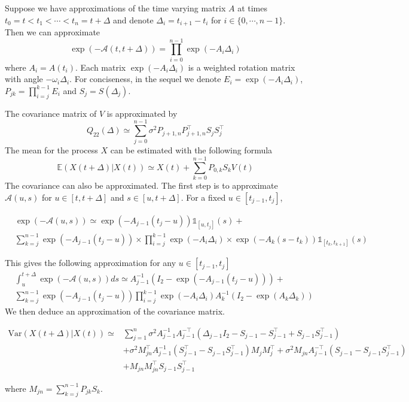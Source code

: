 \documentclass[aoas]{imsart}
\theoremstyle{definition}
\theoremstyle{remark}
\theoremstyle{remark}
\newcommand {\E}{\mathbb{E}}
\newcommand {\1}{\mathbb{1}}
\begin{document}
Suppose we have approximations of the time varying matrix $A$ at times $t_0=t < t_1 < \cdots < t_n=t+\Delta$ and denote $\Delta_i=t_{i+1}-t_i$ for $i \in \{0,\cdots,n-1\}$.
Then we can approximate
\[\exp(-\mathcal{A}(t,t+\Delta))=\prod_{i=0}^{n-1} \exp(-A_i\Delta_i)\]
where $A_i=A(t_i)$. Each matrix $\exp(-A_i\Delta_i)$ is a weighted rotation matrix with angle $-\omega_i\Delta_i$.
For conciseness, in the sequel we denote $E_i=\exp(-A_i\Delta_i)$, $P_{jk}= \prod_{i=j}^{k-1} E_i$ and $S_j=S(\Delta_j)$.

The covariance matrix of $V$ is approximated by 
\[Q_{22}(\Delta)\simeq\sum_{j=0}^{n-1} \sigma^2 P_{j+1,n} P_{j+1,n}^\top S_j S_j^\top\]
The mean for the process $X$ can be estimated with the following formula
\[\E(X(t+\Delta) \vert X(t)) \simeq X(t)+\sum_{k=0}^{n-1} P_{0,k} S_k  V(t) \]
The covariance can also be approximated. The first step is to approximate $\mathcal{A}(u,s)$ for $u \in [t,t+\Delta]$ and $s \in [u,t+\Delta]$. For a fixed $u \in [t_{j-1},t_j]$, 

\begin{align*}
	& \exp(-\mathcal{A}(u,s)) \simeq 
	\exp(-A_{j-1}(t_j-u)) \1_{[u,t_j]}(s) +\\
	& \sum_{k=j}^{n-1} \exp(-A_{j-1}(t_j-u)) \times \prod_{i=j}^{k-1} \exp(-A_i \Delta_i) \times \exp(-A_k (s-t_k)) \1_{[t_k,t_{k+1}]}(s)
\end{align*}

This gives the following approximation for any $u \in [t_{j-1},t_j]$
\begin{align*}
	&\int_u ^{t+\Delta} \exp(-\mathcal{A}(u,s)) ds \simeq A_{j-1}^{-1} (I_2-\exp(-A_{j-1} (t_j-u)))+ \\
	&\sum_{k=j}^{n-1} \exp(-A_{j-1} (t_j-u)) \prod_{i=j}^{k-1} \exp(-A_i \Delta_i) A_k^{-1} (I_2- \exp(A_k \Delta_k)) 
\end{align*}
We then deduce an approximation of the covariance matrix.

\begin{align*}
	\mbox{Var}(X(t+\Delta) \vert X(t)) \simeq &\sum_{j=1}^n \sigma^2 A_{j-1}^{-1} A_{j-1}^{-\top}(\Delta_{j-1} I_2-S_{j-1}-S_{j-1}^\top + S_{j-1}S_{j-1}^\top) \\
	&+ \sigma^2  M_{jn}^\top A_{j-1}^{-1} (S_{j-1}^\top -S_{j-1} S_{j-1}^\top)M_j M_j^\top + \sigma^2  M_{jn} A_{j-1}^{-\top} (S_{j-1} -S_{j-1} S_{j-1}^\top) \\
	&+M_{jn} M_{jn}^\top S_{j-1} S_{j-1}^\top 
\end{align*}

where $M_{jn} = \sum_{k=j}^{n-1} P_{jk} S_k $.
\end{document}
